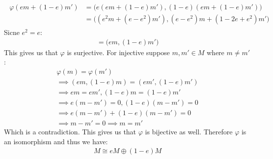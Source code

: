 \begin{enumerate}[label=]
\begin{gather*}
            \begin{split}
                \varphi(em + (1 - e)m') & = \big(e(em + (1 - e)m'), (1 - e) (em + (1 - e)m') \big) \\
                & = \big((e^2m + (e - e^2) m'), (e - e^2)m + (1 - 2e + e^2)m'\big)
            \end{split}
        \end{gather*}
        Sicne $e^2 = e$:
        \begin{gather*}
            = \big(em, (1 - e)m'\big)
        \end{gather*}
        This gives us that $\varphi$ is surjective. For injective suppose $m, m' \in M$ where $m \ne m'$:
        \begin{gather*}
            \varphi(m) = \varphi(m') \\
            \implies (em, (1 - e)m) = (em', (1 - e)m') \\
            \implies em = em' , (1 - e)m = (1 - e)m' \\
            \implies e(m - m') = 0 , (1 - e)(m - m') = 0 \\
            \implies e(m - m') + (1 - e)(m - m') = 0 \\
            \implies m - m' = 0 \implies m = m'
        \end{gather*}
        Which is a contradiction. This gives us that $\varphi$ is bijective as well. Therefore $\varphi$ is an isomorphism and thus we have:
        \begin{gather*}
            M \cong eM \oplus (1 - e)M
        \end{gather*}
\end{enumerate}
